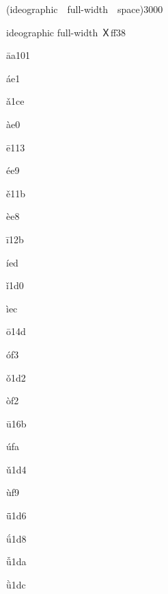 \documentclass[avery5371,grid]{flashcards}
\newcommand{\fl}[2]{\begin{flashcard}{#1}{#2}\end{flashcard}}
\begin{document}
\fl{(ideographic　full-width　space)}{3000}

\fl{ideographic full-width Ｘ}{ff38}

\fl{ā}{a101}

\fl{á}{e1}

\fl{ǎ}{1ce}

\fl{à}{e0}

\fl{ē}{113}

\fl{é}{e9}

\fl{ě}{11b}

\fl{è}{e8}

\fl{ī}{12b}

\fl{í}{ed}

\fl{ǐ}{1d0}

\fl{ì}{ec}

\fl{ō}{14d}

\fl{ó}{f3}

\fl{ǒ}{1d2}

\fl{ò}{f2}

\fl{ū}{16b}

\fl{ú}{fa}

\fl{ǔ}{1d4}

\fl{ù}{f9}

\fl{ǖ}{1d6}

\fl{ǘ}{1d8}

\fl{ǚ}{1da}

\fl{ǜ}{1dc}
\end{document}

